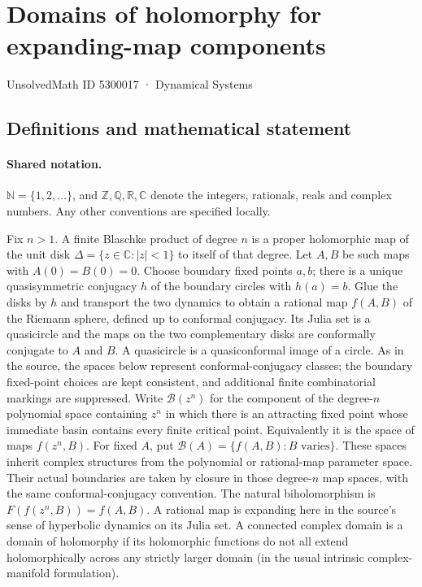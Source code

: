 \documentclass[11pt]{article}
\begin{document}
\setcounter{section}{5300016}
\section{Domains of holomorphy for expanding-map components}\label{5300017}
{\small\sffamily UnsolvedMath ID 5300017 · Dynamical Systems}
\subsection{Definitions and mathematical statement}

\paragraph{Shared notation.}$\mathbb N=\{1,2,\ldots\}$, and $\mathbb Z,\mathbb Q,\mathbb R,\mathbb C$ denote the integers, rationals, reals and complex numbers. Any other conventions are specified locally.


Fix $n>1$. A finite Blaschke product of degree $n$ is a proper holomorphic map of the unit disk $\Delta=\{z\in\mathbb C:|z|<1\}$ to itself of that degree. Let $A,B$ be such maps with $A(0)=B(0)=0$. Choose boundary fixed points $a,b$; there is a unique quasisymmetric conjugacy $h$ of the boundary circles with $h(a)=b$. Glue the disks by $h$ and transport the two dynamics to obtain a rational map $f(A,B)$ of the Riemann sphere, defined up to conformal conjugacy. Its Julia set is a quasicircle and the maps on the two complementary disks are conformally conjugate to $A$ and $B$. A quasicircle is a quasiconformal image of a circle. As in the source, the spaces below represent conformal-conjugacy classes; the boundary fixed-point choices are kept consistent, and additional finite combinatorial markings are suppressed.
Write $\mathcal B(z^n)$ for the component of the degree-$n$ polynomial space containing $z^n$ in which there is an attracting fixed point whose immediate basin contains every finite critical point. Equivalently it is the space of maps $f(z^n,B)$. For fixed $A$, put $\mathcal B(A)=\{f(A,B):B\text{ varies}\}$. These spaces inherit complex structures from the polynomial or rational-map parameter space. Their actual boundaries are taken by closure in those degree-$n$ map spaces, with the same conformal-conjugacy convention. The natural biholomorphism is $F(f(z^n,B))=f(A,B)$.
A rational map is expanding here in the source's sense of hyperbolic dynamics on its Julia set. A connected complex domain is a domain of holomorphy if its holomorphic functions do not all extend holomorphically across any strictly larger domain (in the usual intrinsic complex-manifold formulation).
\end{document}
